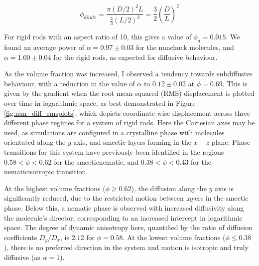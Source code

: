 \documentclass[11pt, a4paper]{article} %
\begin{document}
\begin{equation}
\phi_{dilute} = \frac{\pi(D/2)^{2}L}{\frac{4}{3}(L/2)^{3}} = \frac{3}{2} \left( \frac{D}{L}\right)^{2} 
\end{equation}

For rigid rods with an aspect ratio of 10, this gives a value of $\phi_{d} = 0.015$. We found an average power of $ \alpha = 0.97 \pm 0.03 $ for the nunchuck molecules, and $ \alpha = 1.00 \pm 0.04 $ for the rigid rods, as expected for diffusive behaviour. 

As the volume fraction was increased, I observed a tendency towards subdiffusive behaviour, with a reduction in the value of $\alpha$ to $0.12 \pm 0.02 $ at $\phi = 0.69$. This is given by the gradient when the root mean-squared (RMS) displacement is plotted over time in logarithmic space, as best demonstrated in Figure \ref{fig:nun_diff_rmsplots}, which depicts coordinate-wise displacement across three different phase regimes for a system of rigid rods. Here the Cartesian axes may be used, as simulations are configured in a crystalline phase with molecules orientated along the $y$ axis, and smectic layers forming in the $x-z$ plane. Phase transitions for this system have previously been identified in the regions $0.58<\phi<0.62$ for the smectic\textendash nematic, and $0.38<\phi<0.43$ for the nematic\textendash isotropic transition. 

At the highest volume fractions ($\phi \geq 0.62$), the diffusion along the $y$ axis is significantly reduced, due to the restricted motion between layers in the smectic phase. Below this, a nematic phase is observed with increased diffusivity along the molecule's director, corresponding to an increased intercept in logarithmic space. The degree of dynamic anisotropy here, quantified by the ratio of diffusion coefficients $D_{y}/D_{x}$, is $2.12$ for $\phi = 0.58$. At the lowest volume fractions ($\phi \leq 0.38$), there is no preferred direction in the system and motion is isotropic and truly diffusive (as $\alpha = 1$). 
\end{document}
